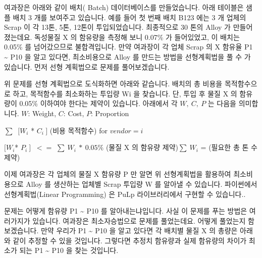 \documentclass[letterpaper,10pt,english]{jupyterBook}
\begin{document}
\sphinxAtStartPar
여과장은 아래와 같이 배치( Batch) 데이터베이스를 만들었습니다. 아래 테이블은 샘플 배치 3 개를 보여주고 있습니다. 예를 들어 첫 번째 배치 B123 에는 3 개 업체의 Scrap 이 각 13톤, 5톤, 12톤이 투입되었습니다. 최종적으로 30 톤의 Alloy 가 만들어졌는데요. 독성물질 X 의 함유량을 측정해 보니 0.07\% 가 들어있었고, 이 배치는 0.05\% 를 넘어갔으므로 불합격입니다.  만약 여과장이 각 업체  Scrap 의 X 함유율 P1 \textasciitilde{} P10 을 알고 있다면, 최소비용으로 Alloy 를 만드는 방법을 선형계획법을 풀 수 가 있습니다. 먼저 선형 계획법으로 문제를 풀어보겠습니다.



\sphinxAtStartPar
위 문제를 선형 계획법으로 도식화하면 아래와 같습니다. 배치의 총 비용을 목적함수으로 하고, 목적함수를 최소화하는 투입량  Wi  을 찾습니다. 단, 투입 후 물질 X 의 함유량이 0.05\% 이하여야 한다는 제약이 있습니다.  아래에서 각 \( W,\ C,\ P \) 는  다음을 의미합니다.
\( W \): Weight, \( C \): Cost,  \( P \): Proportion

\sphinxAtStartPar
{} \( \sum\ \) \( [ W_i \) * \( C_i  \ ] \) (비용 목적함수) for \( vendor = i \)

\sphinxAtStartPar
{}

\sphinxAtStartPar
\( [ W_i \)* \( P_i  \ ] \) \(\ <= \) \(∑ \ W_i \ * \ 0.05\% \) (물질 X 의 함유량 제약)\( \sum\ W_i \)  =  (필요한 총 톤 수 제약)

\sphinxAtStartPar
이제 여과장은 각 업체의 물질 X 함유량 P 만 알면 위 선형계획법을 활용하여 최소비용으로 Alloy 를 생산하는 업체별 Scrap 투입량  W 를 알아낼 수 있습니다. 파이썬에서 선형계획법(Linear Programming) 은 PuLp 라이브러리에서 구현할 수 있습니다..

\sphinxAtStartPar
문제는 어떻게  함유량 P1 \textasciitilde{} P10 를 알아내는냐입니다. 사실 이 문제를 푸는 방법은 여러가지가 있습니다. 여과장은 최소자승법으로 문제를 풀었는데요. 어떻게 풀었는지 함 보겠습니다.  만약 우리가 P1 \textasciitilde{} P10 을 알고 있다면 각 배치별 물질 X 의 총량은 아래와 같이 추정할 수 있을 것입니다. 그렇다면 추정치 함유량과 실제 함유량의 차이가 최소가 되는 P1 \textasciitilde{} P10 을 찾는 것입니다.









\renewcommand{\indexname}{Index}
\printindex
\end{document}
